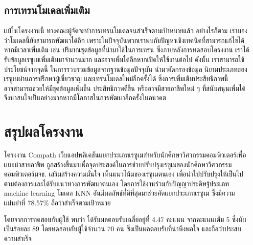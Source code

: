 \subsection{การเทรนโมเดลเพิ่มเติม}
\par{
    แม้ในโครงงานนี้ ทางคณะผู้จัดจะทำการเทรนโมเดลจนสำเร็จตามเป้าหมายแล้ว อย่างไรก็ตาม เรามองว่าโมเดลนี้ยังสามารถพัฒนาได้อีก เพราะในปัจจุบันพวกเราพบกับปัญหาเชิงเทคนิคที่สามารถแก้ไขได้หากมีเวลาเพิ่มเติม
    เช่น ปริมาณชุดข้อมูลที่นำมาใช้ในการเทรน ซึ่งภายหลังการทดสอบโครงงาน เราได้รับข้อมูลเรซูเมเพิ่มเติมมาจำนวนมาก และอาจเพิ่มได้อีกหากเปิดให้ใช้งานต่อไป
    ดังนั้น เราสามารถใช้ประโยชน์จากจุดนี้ ในการรวบรวมข้อมูลจากฐานข้อมูลปัจจุบัน นำมาคัดกรองข้อมูล นิยามประเภทของเรซูเมผ่านการปรึกษาผู้เชี่ยวชาญ 
    และเทรนโมเดลใหม่อีกครั้งได้ ซึ่งการเพิ่มเติมประสิทธิภาพนี้ อาจสามารถช่วยให้มีชุดข้อมูลเพิ่มขึ้น ประสิทธิภาพดีขึ้น หรืออาจมีสายอาชีพใหม่ ๆ ที่สนับสนุนเพิ่มได้
    จึงน่าสนใจเป็นอย่างมากหากมีโอกาสในการพัฒนาอีกครั้งในอนาคต
}

\section{สรุปผลโครงงาน}
\par{
    โครงงาน Compath เว็บแอปพลิเคชันแยกประเภทเรซูเมสำหรับนักศึกษาวิศวกรรมคอมพิวเตอร์เพื่อแนะนำสายอาชีพ
    ถูกสร้างขึ้นมาเพื่อจุดประสงค์ในการช่วยปรับปรุงเรซูเมของนักศึกษาวิศวกรรมคอมพิวเตอร์มจธ. เสริมสร้างความมั่นใจ เห็นแนวโน้มของเรซูเมตนเอง เพื่อนำไปปรับปรุงให้เป็นไปตามต้องการและได้รับแนวทางการพัฒนาตนเอง
    โดยการใช้งานร่วมกับปัญญาประดิษฐ์ประเภท machine learning โมเดล KNN อันมีผลลัพธ์ที่ดีที่สุดมาช่วยคัดแยกประเภทเรซูเม ซึ่งมีความแม่นยำที่ 78.57\% ถือว่าสำเร็จตามเป้าหมาย
    
    โดยจากการทดสอบกับผู้ใช้ พบว่า ได้รับผลตอบรับเฉลี่ยอยู่ที่ 4.47 คะแนน จากคะแนนเต็ม 5 ซึ่งนับเป็นร้อยละ 89 โดยทดสอบกับผู้ใช้จำนวน 70 คน ซึ่งเป็นผลตอบรับที่น่าพึงพอใจ และถือว่าประสบความสำเร็จ
}